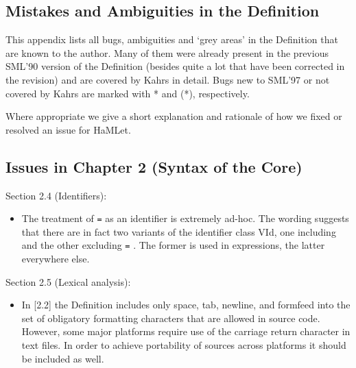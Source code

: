 \documentclass[twoside,titlepage]{article}
\begin{document}
\vfill
\pagebreak
\begin{appendix}

\section{Mistakes and Ambiguities in the Definition}
\label{definitionbugs}

This appendix lists all bugs, ambiguities and `grey areas' in the Definition that are known to the author. Many of them were already present in the previous SML'90 version of the Definition \cite{definition90} (besides quite a lot that have been corrected in the revision) and are covered by Kahrs \cite{mistakes, addenda} in detail. Bugs new to SML'97 or not covered by Kahrs are marked with * and (*), respectively.

Where appropriate we give a short explanation and rationale of how we fixed or resolved an issue for HaMLet.


\subsection{Issues in Chapter 2 (Syntax of the Core)}
\label{bugschapter2}

Section 2.4 (Identifiers):

\begin{itemize}
\item The treatment of {\tt =} as an identifier is extremely ad-hoc. The wording suggests that there are in fact two variants of the identifier class VId, one including and the other excluding {\tt =} . The former is used in expressions, the latter everywhere else.
\end{itemize}


Section 2.5 (Lexical analysis):
\nopagebreak

\begin{itemize}
\item In [2.2] the Definition includes only space, tab, newline, and formfeed into the set of obligatory formatting characters that are allowed in source code. However, some major platforms require use of the carriage return character in text files. In order to achieve portability of sources across platforms it should be included as well.


\end{itemize}
\end{appendix}
\end{document}

